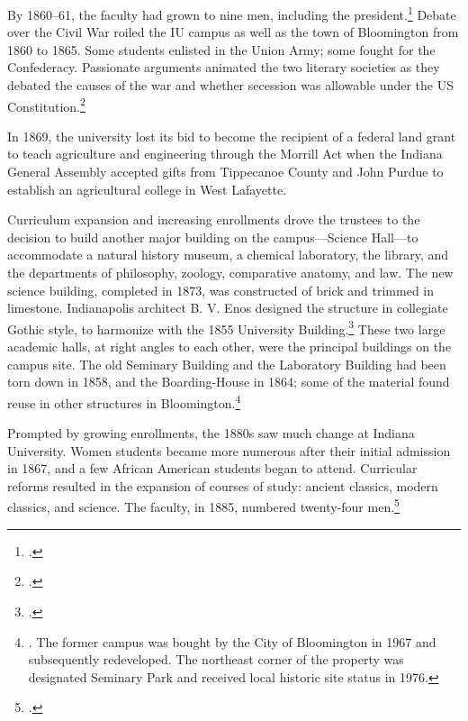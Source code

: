 \documentclass[
  american,
  letterpaper,
]{scrreprt}
\begin{document}
By 1860--61, the faculty had grown to nine men, including the
president.\footnote{.} Debate over the Civil War roiled
the IU campus as well as the town of Bloomington from 1860 to 1865. Some
students enlisted in the Union Army; some fought for the Confederacy.
Passionate arguments animated the two literary societies as they debated
the causes of the war and whether secession was allowable under the US
Constitution.\footnote{.}

In 1869, the university lost its bid to become the recipient of a
federal land grant to teach agriculture and engineering through the
Morrill Act when the Indiana General Assembly accepted gifts from
Tippecanoe County and John Purdue to establish an agricultural college
in West Lafayette.

Curriculum expansion and increasing enrollments drove the trustees to
the decision to build another major building on the campus---Science
Hall---to accommodate a natural history museum, a chemical laboratory,
the library, and the departments of philosophy, zoology, comparative
anatomy, and law. The new science building, completed in 1873, was
constructed of brick and trimmed in limestone. Indianapolis architect B.
V. Enos designed the structure in collegiate Gothic style, to harmonize
with the 1855 University Building.\footnote{.} These two large academic halls, at right angles to each
other, were the principal buildings on the campus site. The old Seminary
Building and the Laboratory Building had been torn down in 1858, and the
Boarding-House in 1864; some of the material found reuse in other
structures in Bloomington.\footnote{. The former campus was bought by the City of Bloomington in
  1967 and subsequently redeveloped. The northeast corner of the
  property was designated Seminary Park and received local historic site
  status in 1976.}

Prompted by growing enrollments, the 1880s saw much change at Indiana
University. Women students became more numerous after their initial
admission in 1867, and a few African American students began to attend.
Curricular reforms resulted in the expansion of courses of study:
ancient classics, modern classics, and science. The faculty, in 1885,
numbered twenty-four men.\footnote{.}
\end{document}

